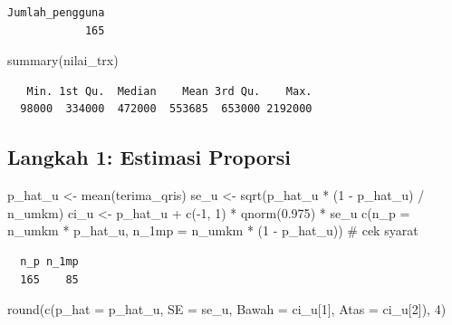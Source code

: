 \documentclass[
  indonesian,
  letterpaper,
]{book}
\newenvironment{Shaded}{\begin{snugshade}}{\end{snugshade}}
\newcommand{\AttributeTok}[1]{\textcolor[rgb]{0.40,0.45,0.13}{#1}}
\newcommand{\CommentTok}[1]{\textcolor[rgb]{0.37,0.37,0.37}{#1}}
\newcommand{\DecValTok}[1]{\textcolor[rgb]{0.68,0.00,0.00}{#1}}
\newcommand{\FloatTok}[1]{\textcolor[rgb]{0.68,0.00,0.00}{#1}}
\newcommand{\FunctionTok}[1]{\textcolor[rgb]{0.28,0.35,0.67}{#1}}
\newcommand{\NormalTok}[1]{\textcolor[rgb]{0.00,0.23,0.31}{#1}}
\newcommand{\OtherTok}[1]{\textcolor[rgb]{0.00,0.23,0.31}{#1}}
\newcommand{\SpecialCharTok}[1]{\textcolor[rgb]{0.37,0.37,0.37}{#1}}
\begin{document}
\begin{verbatim}
Jumlah_pengguna 
            165 
\end{verbatim}

\begin{Shaded}
\begin{Highlighting}[]
\FunctionTok{summary}\NormalTok{(nilai\_trx)}
\end{Highlighting}
\end{Shaded}

\begin{verbatim}
   Min. 1st Qu.  Median    Mean 3rd Qu.    Max. 
  98000  334000  472000  553685  653000 2192000 
\end{verbatim}

\subsection{Langkah 1: Estimasi
Proporsi}\label{langkah-1-estimasi-proporsi}

\begin{Shaded}
\begin{Highlighting}[]
\NormalTok{p\_hat\_u }\OtherTok{\textless{}{-}} \FunctionTok{mean}\NormalTok{(terima\_qris)}
\NormalTok{se\_u }\OtherTok{\textless{}{-}} \FunctionTok{sqrt}\NormalTok{(p\_hat\_u }\SpecialCharTok{*}\NormalTok{ (}\DecValTok{1} \SpecialCharTok{{-}}\NormalTok{ p\_hat\_u) }\SpecialCharTok{/}\NormalTok{ n\_umkm)}
\NormalTok{ci\_u }\OtherTok{\textless{}{-}}\NormalTok{ p\_hat\_u }\SpecialCharTok{+} \FunctionTok{c}\NormalTok{(}\SpecialCharTok{{-}}\DecValTok{1}\NormalTok{, }\DecValTok{1}\NormalTok{) }\SpecialCharTok{*} \FunctionTok{qnorm}\NormalTok{(}\FloatTok{0.975}\NormalTok{) }\SpecialCharTok{*}\NormalTok{ se\_u}
\FunctionTok{c}\NormalTok{(}\AttributeTok{n\_p =}\NormalTok{ n\_umkm }\SpecialCharTok{*}\NormalTok{ p\_hat\_u, }\AttributeTok{n\_1mp =}\NormalTok{ n\_umkm }\SpecialCharTok{*}\NormalTok{ (}\DecValTok{1} \SpecialCharTok{{-}}\NormalTok{ p\_hat\_u)) }\CommentTok{\# cek syarat}
\end{Highlighting}
\end{Shaded}

\begin{verbatim}
  n_p n_1mp 
  165    85 
\end{verbatim}

\begin{Shaded}
\begin{Highlighting}[]
\FunctionTok{round}\NormalTok{(}\FunctionTok{c}\NormalTok{(}\AttributeTok{p\_hat =}\NormalTok{ p\_hat\_u, }\AttributeTok{SE =}\NormalTok{ se\_u, }\AttributeTok{Bawah =}\NormalTok{ ci\_u[}\DecValTok{1}\NormalTok{], }\AttributeTok{Atas =}\NormalTok{ ci\_u[}\DecValTok{2}\NormalTok{]), }\DecValTok{4}\NormalTok{)}
\end{Highlighting}
\end{Shaded}
\end{document}
